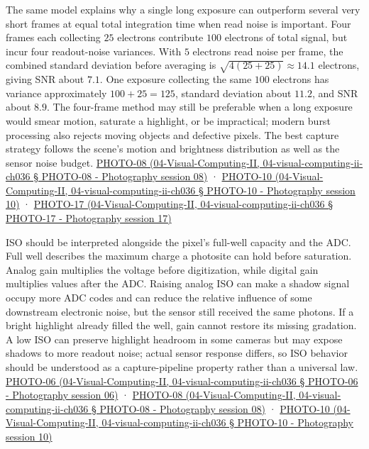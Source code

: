 The same model explains why a single long exposure can outperform several very short frames at equal total integration time when read noise is important. Four frames each collecting \(25\) electrons contribute \(100\) electrons of total signal, but incur four readout-noise variances. With \(5\) electrons read noise per frame, the combined standard deviation before averaging is \(\sqrt{4(25+25)}\approx14.1\) electrons, giving SNR about \(7.1\). One exposure collecting the same \(100\) electrons has variance approximately \(100+25=125\), standard deviation about \(11.2\), and SNR about \(8.9\). The four-frame method may still be preferable when a long exposure would smear motion, saturate a highlight, or be impractical; modern burst processing also rejects moving objects and defective pixels. The best capture strategy follows the scene's motion and brightness distribution as well as the sensor noise budget. \href{}{PHOTO-08 (04-Visual-Computing-II, 04-visual-computing-ii-ch036 § PHOTO-08 - Photography session 08)} · \href{}{PHOTO-10 (04-Visual-Computing-II, 04-visual-computing-ii-ch036 § PHOTO-10 - Photography session 10)} · \href{}{PHOTO-17 (04-Visual-Computing-II, 04-visual-computing-ii-ch036 § PHOTO-17 - Photography session 17)}

ISO should be interpreted alongside the pixel's full-well capacity and the ADC. Full well describes the maximum charge a photosite can hold before saturation. Analog gain multiplies the voltage before digitization, while digital gain multiplies values after the ADC. Raising analog ISO can make a shadow signal occupy more ADC codes and can reduce the relative influence of some downstream electronic noise, but the sensor still received the same photons. If a bright highlight already filled the well, gain cannot restore its missing gradation. A low ISO can preserve highlight headroom in some cameras but may expose shadows to more readout noise; actual sensor response differs, so ISO behavior should be understood as a capture-pipeline property rather than a universal law. \href{}{PHOTO-06 (04-Visual-Computing-II, 04-visual-computing-ii-ch036 § PHOTO-06 - Photography session 06)} · \href{}{PHOTO-08 (04-Visual-Computing-II, 04-visual-computing-ii-ch036 § PHOTO-08 - Photography session 08)} · \href{}{PHOTO-10 (04-Visual-Computing-II, 04-visual-computing-ii-ch036 § PHOTO-10 - Photography session 10)}

